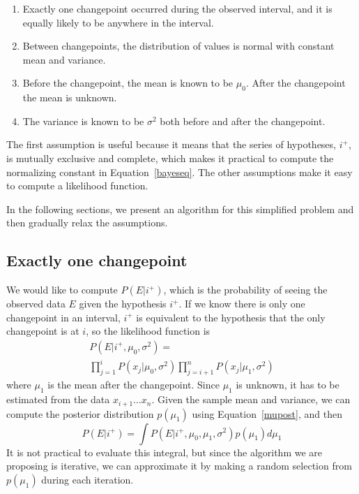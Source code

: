 \documentclass[twocolumn,11pt]{article}
\begin{document}
\begin{enumerate}

\item Exactly one changepoint occurred
during the observed interval, and it is equally likely to be
anywhere in the interval.

\item Between changepoints, the distribution of values is normal
with constant mean and variance.

\item Before the changepoint, the mean is known to be $\mu_0$.  After
the changepoint the mean is unknown.

\item The variance is known to be $\sigma^2$ both before and after
the changepoint.

\end{enumerate}

The first assumption is useful because it means that the series of
hypotheses, $i^+$, is mutually exclusive and complete, which makes it
practical to compute the normalizing constant in
Equation~\ref{bayeseq}.  The other assumptions make it easy to compute
a likelihood function.

In the following sections, we present an algorithm for this
simplified problem and then gradually relax the assumptions.


\subsection{Exactly one changepoint}
\label{likefun}

We would like to compute $P(E|i^+)$, which is the probability of
seeing the observed data $E$ given the hypothesis $i^+$.
If we know there is only one changepoint in an interval,
$i^+$ is equivalent to the hypothesis that the only
changepoint is at $i$, so the likelihood function is
%
\begin{multline}
P(E|i^+, \mu_0, \sigma^2) = \\
\prod_{j=1}^{i} P(x_j | \mu_0, \sigma^2) 
\prod_{j=i+1}^{n} P(x_j | \mu_1, \sigma^2)
\label{likelihood}
\end{multline} 
%
where $\mu_1$ is the mean after the changepoint.  Since $\mu_1$
is unknown, it has to be estimated from the data $x_{i+1} \ldots x_n$.  Given
the sample mean and variance, we can compute the posterior
distribution $p(\mu_1)$ using Equation~\ref{mupost}, and then
%
\begin{equation}
P(E|i^+) = \int P(E|i^+, \mu_0, \mu_1, \sigma^2) p(\mu_1) d \mu_1
\end{equation}
%
It is not practical to evaluate this integral, but since the algorithm
we are proposing is iterative, we can approximate it by
making a random selection from $p(\mu_1)$
during each iteration.
\end{document}
